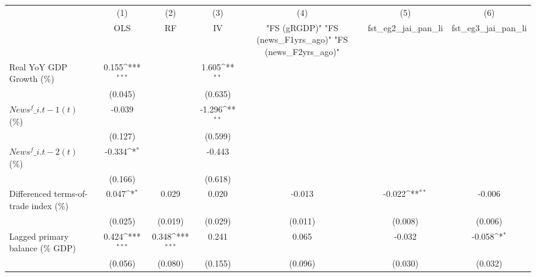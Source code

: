 {
\def\sym#1{\ifmmode^{#1}\else\(^{#1}\)\fi}
\begin{tabular}{l*{6}{c}}
\toprule
                    &\multicolumn{1}{c}{(1)}&\multicolumn{1}{c}{(2)}&\multicolumn{1}{c}{(3)}&\multicolumn{1}{c}{(4)}&\multicolumn{1}{c}{(5)}&\multicolumn{1}{c}{(6)}\\
                    &\multicolumn{1}{c}{OLS}&\multicolumn{1}{c}{RF}&\multicolumn{1}{c}{IV}&\multicolumn{1}{c}{ "FS (gRGDP)"  "FS (news\_F1yrs\_ago)"  "FS (news\_F2yrs\_ago)" }&\multicolumn{1}{c}{fst\_eg2\_jai\_pan\_li}&\multicolumn{1}{c}{fst\_eg3\_jai\_pan\_li}\\
\midrule
Real YoY GDP Growth (\%)&       0.155\sym{***}&                     &       1.605\sym{**} &                     &                     &                     \\
                    &     (0.045)         &                     &     (0.635)         &                     &                     &                     \\
\addlinespace
$ News^f\_{i.t-1}(t)$ (\%)&      -0.039         &                     &      -1.296\sym{**} &                     &                     &                     \\
                    &     (0.127)         &                     &     (0.599)         &                     &                     &                     \\
\addlinespace
$ News^f\_{i.t-2}(t)$ (\%)&      -0.334\sym{*}  &                     &      -0.443         &                     &                     &                     \\
                    &     (0.166)         &                     &     (0.618)         &                     &                     &                     \\
\addlinespace
Differenced terms-of-trade index (\%)&       0.047\sym{*}  &       0.029         &       0.020         &      -0.013         &      -0.022\sym{**} &      -0.006         \\
                    &     (0.025)         &     (0.019)         &     (0.029)         &     (0.011)         &     (0.008)         &     (0.006)         \\
\addlinespace
Lagged primary balance (\% GDP)&       0.424\sym{***}&       0.348\sym{***}&       0.241         &       0.065         &      -0.032         &      -0.058\sym{*}  \\
                    &     (0.056)         &     (0.080)         &     (0.155)         &     (0.096)         &     (0.030)         &     (0.032)         \\

\end{tabular}}
